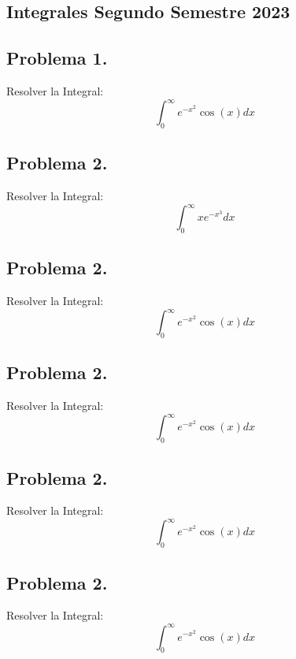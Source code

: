 
\begin{center}
    \section{Integrales Segundo Semestre 2023}

    \begin{CajaTitulo}{\begin{center}\subsection*{Problema 1.}\end{center}}
        Resolver la Integral: \[\int_{0}^{\infty}e^{-x^2}\cos(x)      dx\]
    \end{CajaTitulo} 

    \begin{CajaTitulo}{\begin{center}\subsection*{Problema 2.}\end{center}}
        Resolver la Integral: \[\int_{0}^{\infty}xe^{-x^3}dx\]
    \end{CajaTitulo} 

    \begin{CajaTitulo}{\begin{center}\subsection*{Problema 2.}\end{center}}
        Resolver la Integral: \[\int_{0}^{\infty}e^{-x^2}\cos(x)      dx\]
    \end{CajaTitulo} 
    
    \begin{CajaTitulo}{\begin{center}\subsection*{Problema 2.}\end{center}}
        Resolver la Integral: \[\int_{0}^{\infty}e^{-x^2}\cos(x)      dx\]
    \end{CajaTitulo} 
    
    \begin{CajaTitulo}{\begin{center}\subsection*{Problema 2.}\end{center}}
        Resolver la Integral: \[\int_{0}^{\infty}e^{-x^2}\cos(x)      dx\]
    \end{CajaTitulo} 

    \begin{CajaTitulo}{\begin{center}\subsection*{Problema 2.}\end{center}}
        Resolver la Integral: \[\int_{0}^{\infty}e^{-x^2}\cos(x)      dx\]
    \end{CajaTitulo} 

\end{center}
